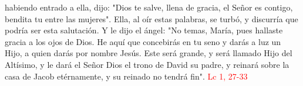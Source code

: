 habiendo entrado a ella, dijo: "Dios te salve, llena de gracia, el Señor es contigo, bendita tu entre las mujeres". Ella, al oír estas palabras, se turbó,
y discurría que podría ser esta salutación. Y le dijo el ángel: "No temas, María, pues hallaste gracia a los ojos de Dios. He aquí que concebirás en tu seno y darás a luz un Hijo,
a quien darás por nombre Jesús. Este será grande, y será llamado Hijo del Altísimo, y le dará el Señor Dios el trono de David su padre, y reinará sobre la casa de Jacob etérnamente, 
y su reinado no tendrá fin". \textcolor{red}{Lc 1, 27-33}
